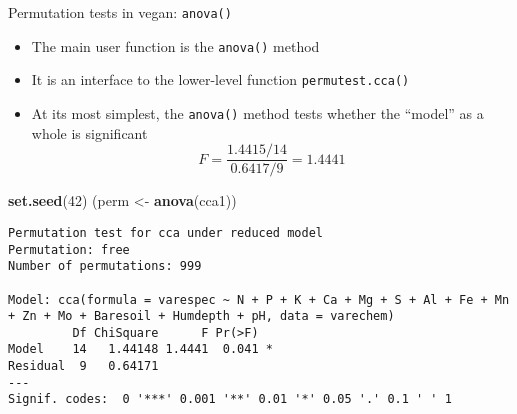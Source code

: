 \documentclass[10pt,ignorenonframetext,compress, aspectratio=169]{beamer}
\newenvironment{Shaded}{\begin{snugshade}}{\end{snugshade}}
\newcommand{\KeywordTok}[1]{\textcolor[rgb]{0.13,0.29,0.53}{\textbf{{#1}}}}
\newcommand{\DecValTok}[1]{\textcolor[rgb]{0.00,0.00,0.81}{{#1}}}
\newcommand{\StringTok}[1]{\textcolor[rgb]{0.31,0.60,0.02}{{#1}}}
\newcommand{\NormalTok}[1]{{#1}}
\begin{document}
\begin{frame}[fragile]{Permutation tests in vegan: \texttt{anova()}}

\begin{itemize}
\itemsep1pt\parskip0pt
\item
  The main user function is the \texttt{anova()} method
\item
  It is an interface to the lower-level function
  \texttt{permutest.cca()}
\item
  At its most simplest, the \texttt{anova()} method tests whether the
  ``model'' as a whole is significant
  \[F = \frac{1.4415 / 14}{0.6417 / 9} = 1.4441\]
\end{itemize}

\tiny

\begin{Shaded}
\begin{Highlighting}[]
\KeywordTok{set.seed}\NormalTok{(}\DecValTok{42}\NormalTok{)}
\NormalTok{(perm <-}\StringTok{ }\KeywordTok{anova}\NormalTok{(cca1))}
\end{Highlighting}
\end{Shaded}

\begin{verbatim}
Permutation test for cca under reduced model
Permutation: free
Number of permutations: 999

Model: cca(formula = varespec ~ N + P + K + Ca + Mg + S + Al + Fe + Mn + Zn + Mo + Baresoil + Humdepth + pH, data = varechem)
         Df ChiSquare      F Pr(>F)  
Model    14   1.44148 1.4441  0.041 *
Residual  9   0.64171                
---
Signif. codes:  0 '***' 0.001 '**' 0.01 '*' 0.05 '.' 0.1 ' ' 1
\end{verbatim}

\normalsize

\end{frame}
\end{document}
